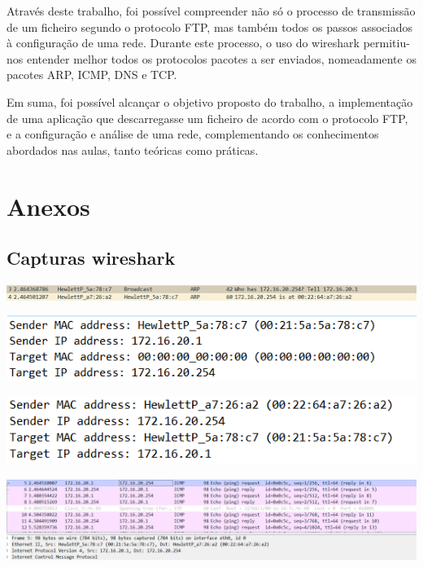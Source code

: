 \documentclass[11pt]{article}
\begin{document}
Através deste trabalho, foi possível compreender não só o processo de transmissão de um ficheiro segundo o protocolo FTP, mas também todos os passos associados à configuração de uma rede. Durante este processo, o uso do wireshark permitiu-nos entender melhor todos os protocolos pacotes a ser enviados, nomeadamente os pacotes ARP, ICMP, DNS e TCP.

Em suma, foi possível alcançar o objetivo proposto do trabalho, a implementação de uma aplicação que descarregasse um ficheiro de acordo com o protocolo FTP, e a configuração e análise de uma rede, complementando os conhecimentos abordados nas aulas, tanto teóricas como práticas.  


\pagebreak

\section{Anexos}

\subsection{Capturas wireshark}

\includegraphics[width=\textwidth]{figura1.PNG}

\includegraphics[width=\textwidth]{figura2.PNG}

\includegraphics[width=\textwidth]{figura3.PNG}

\includegraphics[width=\textwidth]{figura4.PNG}
\end{document}
